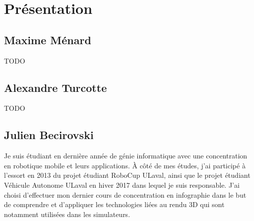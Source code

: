 \chapter{Présentation}
\label{s:présentation}

\section{Maxime Ménard}
TODO
\section{Alexandre Turcotte}
TODO
\section{Julien Becirovski}
Je suis étudiant en dernière année de génie informatique avec une concentration en robotique mobile et leurs applications. À côté de mes études, j'ai participé à l'essort en 2013 du projet étudiant RoboCup ULaval, ainsi que le projet étudiant Véhicule Autonome ULaval en hiver 2017 dans lequel je suis responsable. J'ai choisi d'effectuer mon dernier cours de concentration en infographie dans le but de comprendre et d'appliquer les technologies liées au rendu 3D qui sont notamment utilisées dans les simulateurs.